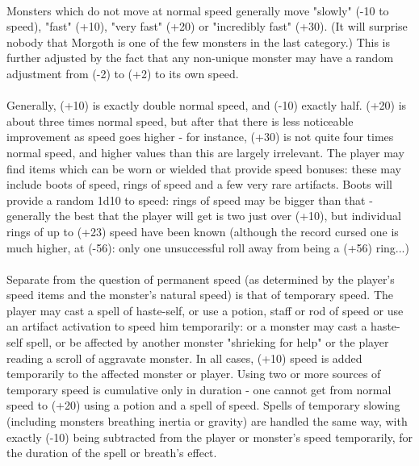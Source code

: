 \paragraph{}
Monsters which do not move at normal speed generally move "slowly" (-10 to
speed), "fast" (+10), "very fast" (+20) or "incredibly fast" (+30). (It will
surprise nobody that Morgoth is one of the few monsters in
the last category.) This is further adjusted by the fact that any
non-unique monster may have a random adjustment from (-2) to (+2) to its
own speed. 

\paragraph{}
Generally, (+10) is exactly double normal speed, and (-10) exactly half.
(+20) is about three times normal speed, but after that there is less
noticeable improvement as speed goes higher - for instance, (+30) is not
quite four times normal speed, and higher values than this are largely
irrelevant. The player may find items which can be worn or wielded that
provide speed bonuses: these may include boots of speed, rings of speed
and a few very rare artifacts. Boots will provide a random 1d10 to speed:
rings of speed may be bigger than that - generally the best that the player
will get is two just over (+10), but individual rings of up to (+23) speed
have been known (although the record cursed one is much higher, at (-56):
only one unsuccessful roll away from being a (+56) ring...)

\paragraph{}
Separate from the question of permanent speed (as determined by the player's
speed items and the monster's natural speed) is that of temporary speed. The
player may cast a spell of haste-self, or use a potion, staff or rod of speed
or use an artifact activation to speed him temporarily: or a monster may cast
a haste-self spell, or be affected by another monster "shrieking for help"
or the player reading a scroll of aggravate monster. In all cases, (+10)
speed is added temporarily to the affected monster or player. Using two or
more sources of temporary speed is cumulative only in duration - one cannot
get from normal speed to (+20) using a potion and a spell of speed. Spells
of temporary slowing (including monsters breathing inertia or gravity) are
handled the same way, with exactly (-10) being subtracted from the player
or monster's speed temporarily, for the duration of the spell or breath's
effect.

